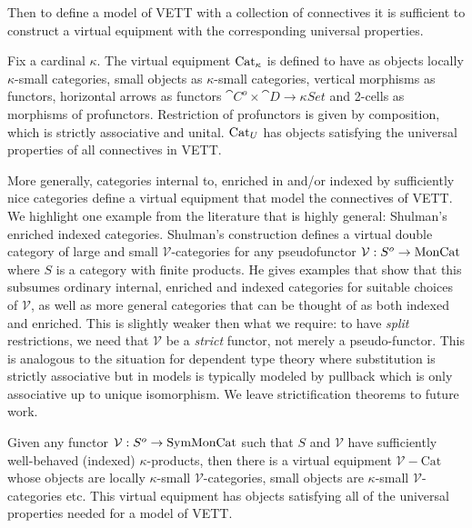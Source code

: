 \documentclass{llncs}
\begin{document}
%

Then to define a model of VETT with a collection of connectives it is
sufficient to construct a virtual equipment with the corresponding
universal properties.
%
\begin{construction}
  Fix a cardinal $\kappa$. The virtual equipment $\textrm{Cat}_{\kappa}$ is
  defined to have as objects locally $\kappa$-small categories, small
  objects as $\kappa$-small categories, vertical morphisms as functors,
  horizontal arrows as functors $\cat C^o \times \cat D \to \kappa Set$ and
  2-cells as morphisms of profunctors. Restriction of profunctors is
  given by composition, which is strictly associative and unital.
  $\textrm{Cat}_{U}$ has objects satisfying the universal properties of all
  connectives in VETT.
\end{construction}

More generally, categories internal to, enriched in and/or indexed by
sufficiently nice categories define a virtual equipment that model the
connectives of VETT. We highlight one example from the literature that
is highly general: Shulman's enriched indexed categories. Shulman's
construction defines a virtual double category of large and small
$\mathcal V$-categories for any pseudofunctor $\mathcal V : S^o \to
\textrm{MonCat}$ where $S$ is a category with finite products. He gives
examples that show that this subsumes ordinary internal, enriched and
indexed categories for suitable choices of $\mathcal V$, as well as
more general categories that can be thought of as both indexed and
enriched.
%
This is slightly weaker then what we require: to have
\emph{split} restrictions, we need that $\mathcal V$ be a
\emph{strict} functor, not merely a pseudo-functor.
%
This is analogous to the situation for dependent type theory where
substitution is strictly associative but in models is typically
modeled by pullback which is only associative up to unique
isomorphism.
%
We leave strictification theorems to future work.  

\begin{construction}
  Given any functor $\mathcal V : S^o \to \textrm{SymMonCat}$ such that $S$
  and $\mathcal V$ have sufficiently well-behaved (indexed)
  $\kappa$-products, then there is a virtual equipment $\mathcal
  V-\textrm{Cat}$ whose objects are locally $\kappa$-small $\mathcal
  V$-categories, small objects are $\kappa$-small $\mathcal
  V$-categories etc. This virtual equipment has objects satisfying all
  of the universal properties needed for a model of VETT.
\end{construction}
\end{document}
